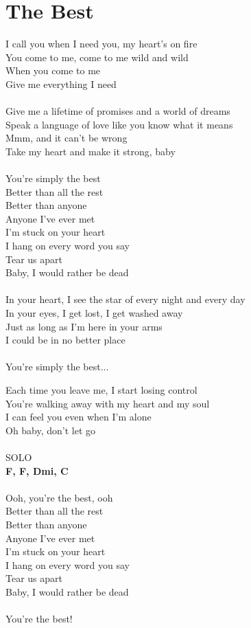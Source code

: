 \section{The Best}
I call you when I need you, my heart's on fire\\
You come to me, come to me wild and wild\\
When you come to me\\
Give me everything I need\\
\\
Give me a lifetime of promises and a world of dreams\\
Speak a language of love like you know what it means\\
Mmm, and it can't be wrong\\
Take my heart and make it strong, baby \\
\\
You're simply the best\\
Better than all the rest\\
Better than anyone\\
Anyone I've ever met\\
I'm stuck on your heart\\
I hang on every word you say\\
Tear us apart\\
Baby, I would rather be dead\\
\\
In your heart, I see the star of every night and every day\\
In your eyes, I get lost, I get washed away\\
Just as long as I'm here in your arms\\
I could be in no better place\\
\\
You're simply the best...
\setlength{\columnsep}{0cm}
\begin{multicols}{2}
Each time you leave me, I start losing control\\
You're walking away with my heart and my soul\\
I can feel you even when I'm alone\\
Oh baby, don't let go\\
\\
SOLO\\
\footnotesize\textbf{F\kr , F\kr , D\kr mi, C\kr}\\
\normalsize
\columnbreak
\\
Ooh, you're the best, ooh\\
Better than all the rest\\
Better than anyone\\
Anyone I've ever met\\
I'm stuck on your heart\\
I hang on every word you say\\
Tear us apart\\
Baby, I would rather be dead\\
\\
You're the best!\\
\end{multicols}
\setlength{\columnsep}{1.2cm}
